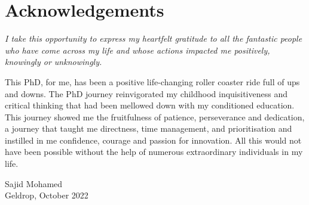 \chapter{Acknowledgements}

\emph{I take this opportunity to express my heartfelt gratitude to all the fantastic people who have come across my life and whose actions impacted me positively, knowingly or unknowingly.}

\vspace{5em}
This PhD, for me, has been a positive life-changing roller coaster ride full of ups and downs. The PhD journey reinvigorated my childhood inquisitiveness and critical thinking that had been mellowed down with my conditioned education. This journey showed me the fruitfulness of patience, perseverance and dedication, a journey that taught me directness, time management, and prioritisation and instilled in me confidence, courage and passion for innovation. All this would not have been possible without the help of numerous extraordinary individuals in my life.

\begin{flushright}
Sajid Mohamed\\
Geldrop, October 2022
\end{flushright}